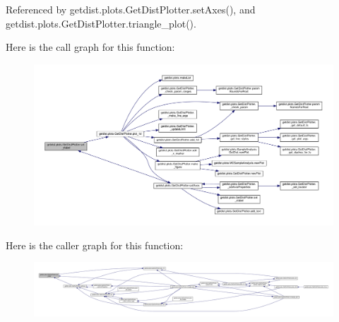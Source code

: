 Referenced by getdist.\+plots.\+Get\+Dist\+Plotter.\+set\+Axes(), and getdist.\+plots.\+Get\+Dist\+Plotter.\+triangle\+\_\+plot().

Here is the call graph for this function\+:
\nopagebreak
\begin{figure}[H]
\begin{center}
\leavevmode
\includegraphics[width=350pt]{classgetdist_1_1plots_1_1GetDistPlotter_ae83a5b69313acacabeb99940a25c1004_cgraph}
\end{center}
\end{figure}
Here is the caller graph for this function\+:
\nopagebreak
\begin{figure}[H]
\begin{center}
\leavevmode
\includegraphics[width=350pt]{classgetdist_1_1plots_1_1GetDistPlotter_ae83a5b69313acacabeb99940a25c1004_icgraph}
\end{center}
\end{figure}
\mbox{\label{classgetdist_1_1plots_1_1GetDistPlotter_afc478614168ba111f0ec1bba56bdb692}} 
